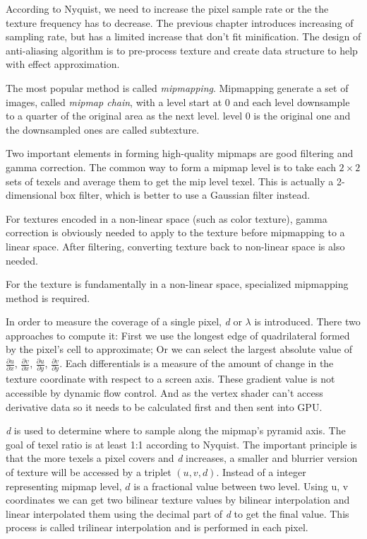 \documentclass[10pt, a4paper]{article}
\begin{document}
    According to Nyquist, we need to increase the pixel sample rate or the the texture frequency has to decrease. The previous chapter introduces increasing of sampling rate, but has a limited increase that don't fit minification. The design of anti-aliasing algorithm is to pre-process texture and create data structure to help with effect approximation.
    
    The most popular method is called \emph{mipmapping}. Mipmapping generate a set of images, called \emph{mipmap chain}, with a level start at 0 and each level downsample to a quarter of the original area as the next level. level 0 is the original one and the downsampled ones are called subtexture. 

    Two important elements in forming high-quality mipmaps are good filtering and gamma correction. The common way to form a mipmap level is to take each $2 \times 2$ sets of texels and average them to get the mip level texel. This is actually a 2-dimensional box filter, which is better to use a Gaussian filter instead. 

    For textures encoded in a non-linear space (such as color texture), gamma correction is obviously needed to apply to the texture before mipmapping to a linear space. After filtering, converting texture back to non-linear space is also needed. 
    
    For the texture is fundamentally in a non-linear space, specialized mipmapping method is required. 

    In order to measure the coverage of a single pixel, \emph{d} or $\lambda$ is introduced. There two approaches to compute it: First we use the longest edge of quadrilateral formed by the pixel's cell to approximate; Or we can select the largest absolute value of $\frac{\partial u}{\partial x}$, $\frac{\partial v}{\partial x}$, $\frac{\partial u}{\partial y}$, $\frac{\partial v}{\partial y}$. Each differentials is a measure of the amount of change in the texture coordinate with respect to a screen axis. These gradient value is not accessible by dynamic flow control. And as the vertex shader can't access derivative data so it needs to be calculated first and then sent into GPU. 

    \emph{d} is used to determine where to sample along the mipmap's pyramid axis. The goal of texel ratio is at least 1:1 according to Nyquist. The important principle is that the more texels a pixel covers and \emph{d} increases, a smaller and blurrier version of texture will be accessed by a triplet $(u, v, d)$. Instead of a integer representing mipmap level, $d$ is a fractional value between two level. Using u, v coordinates we can get two bilinear texture values by bilinear interpolation and linear interpolated them using the decimal part of \emph{d} to get the final value. This process is called trilinear interpolation and is performed in each pixel. 
\end{document}
